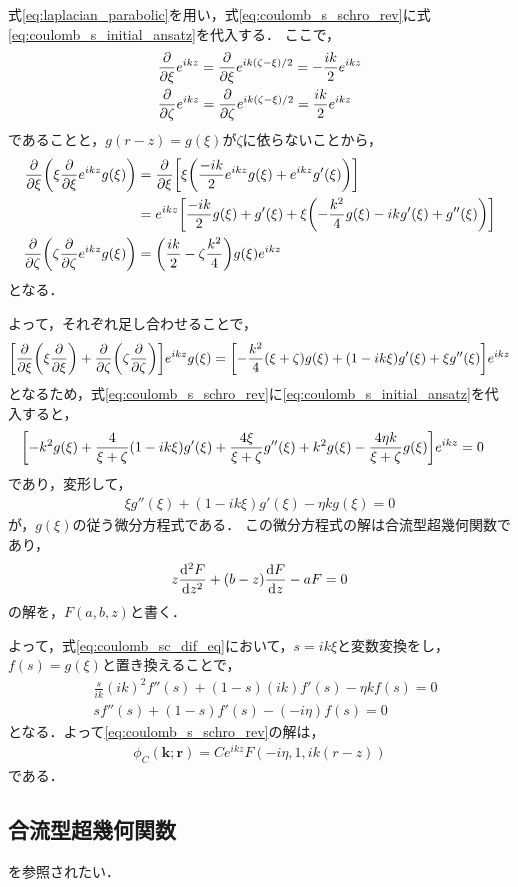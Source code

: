 \documentclass[a4paper,11pt]{ltjsarticle}
\begin{document}
式\ref{eq:laplacian_parabolic}を用い，式\ref{eq:coulomb_s_schro_rev}に式\ref{eq:coulomb_s_initial_ansatz}を代入する．
ここで，
\begin{align*}
  &\pdv{\xi} e^{ikz} = \pdv{\xi} e^{ik(\zeta-\xi)/2} = - \frac{ik}{2} e^{ikz}\\
  &\pdv{\zeta} e^{ikz} =   \pdv{\zeta} e^{ik(\zeta-\xi)/2} =  \frac{ik}{2} e^{ikz}
\end{align*}
であることと，$g(r-z) = g(\xi)$が$\zeta$に依らないことから，
\begin{align*}
  \pdv{\xi}\qty(\xi \pdv{\xi} e^{ikz}g(\xi)) 
  &= \pdv{\xi}\qty[\xi\qty(\frac{-ik}{2}e^{ikz}g(\xi) + e^{ikz}g'(\xi))] \\
  &=e^{ikz}\qty[\frac{-ik}{2} g(\xi) + g'(\xi) + \xi\qty(-\frac{k^2}{4} g(\xi) - ikg'(\xi) + g''(\xi))] \\
  \pdv{\zeta}\qty(\zeta \pdv{\zeta} e^{ikz} g(\xi)) &= \qty( \frac{ik}{2}  - \zeta \frac{k^2}{4})g(\xi)e^{ikz}
\end{align*}
となる．

よって，それぞれ足し合わせることで，
\begin{align*}
  \qty[\pdv{\xi}\qty(\xi\pdv{\xi}) + \pdv{\zeta}\qty(\zeta\pdv{\zeta})]e^{ikz} g(\xi)
  = \qty[ - \frac{k^2}{4}(\xi+\zeta)g(\xi) + \qty(1 - ik\xi )g'(\xi) + \xi g''(\xi)] e^{ikz}
\end{align*}
となるため，式\ref{eq:coulomb_s_schro_rev}に\ref{eq:coulomb_s_initial_ansatz}を代入すると，
\begin{align}\label{eq:scat_sol_dif_eq}
&\qty[-k^2 g(\xi) + \frac{4}{\xi + \zeta} \qty(1-ik\xi )g'(\xi) + \frac{4\xi}{\xi+ \zeta}g''(\xi) + k^2g(\xi) - \frac{4\eta k}{\xi + \zeta} g(\xi)] e^{ikz} = 0 
\end{align}
であり，変形して，
\begin{align}\label{eq:coulomb_sc_dif_eq}
  \xi g''(\xi) + (1 - ik\xi) g'(\xi) - \eta k g(\xi) = 0
\end{align}
が，$g(\xi)$の従う微分方程式である．
この微分方程式の解は合流型超幾何関数であり，
\begin{align}\label{eq:cofluent_hyp_geom_dif}
  z \dv[2]{F}{z} + (b - z) \dv{F}{z} - aF = 0
\end{align}
の解を，$F(a,b,z)$と書く．

よって，式\ref{eq:coulomb_sc_dif_eq}において，$s = ik\xi$と変数変換をし，$f(s) = g(\xi)$と置き換えることで，
\begin{align*}
  &\frac{s}{ik} (ik)^2 f''(s) + (1 - s) (ik) f'(s) - \eta k f(s) = 0 \\
  & s f''(s) + (1-s) f'(s) - (- i \eta) f(s)  = 0
\end{align*}
となる．よって\ref{eq:coulomb_s_schro_rev}の解は，
\begin{align}\label{eq:coulomb_sc_solution}
  \phi_C(\bm{k};\bm{r}) = C e^{ikz} F(-i\eta, 1, ik(r-z))
\end{align}
である．
\subsection{合流型超幾何関数}
\cite{BN01957611}を参照されたい．

\newpage
% 
% 
\printbibliography%
\end{document}

